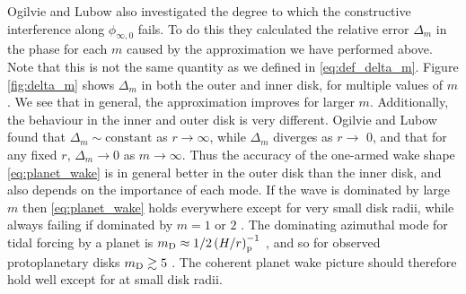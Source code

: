 Ogilvie and Lubow also investigated the degree to which the constructive interference along $\phi_{\infty,0}$ fails.
To do this they calculated the relative error $\Delta_m$ in the phase for each $m$ caused by the approximation we have performed above.
Note that this is not the same quantity as we defined in \ref{eq:def_delta_m}.
Figure \ref{fig:delta_m} shows $\Delta_m$ in both the outer and inner disk, for multiple values of $m$.
We see that in general, the approximation improves for larger $m$.
Additionally, the behaviour in the inner and outer disk is very different.
Ogilvie and Lubow found that $\Delta_m \sim \mathrm{constant}$ as $r \rightarrow \infty$, while $\Delta_m$ diverges as $r \rightarrow$ 0, and that for any fixed $r$, $\Delta_m \rightarrow 0$ as $m \rightarrow \infty$.
Thus the accuracy of the one-armed wake shape \ref{eq:planet_wake} is in general better in the outer disk than the inner disk, and also depends on the importance of each mode.
If the wave is dominated by large $m$ then \ref{eq:planet_wake} holds everywhere except for very small disk radii, while always failing if dominated by $m=1$ or $2$ \citep{ogilvie2002}.
The dominating azimuthal mode for tidal forcing by a planet is $m_{\rm D} \approx 1/2 \left( H/r \right)_{\rm p}^{-1}$ \citep{goldreich1980}, and so for observed protoplanetary disks $m_{\rm D} \gtrsim 5$ \citep{law2021a}. 
The coherent planet wake picture should therefore hold well except for at small disk radii.


